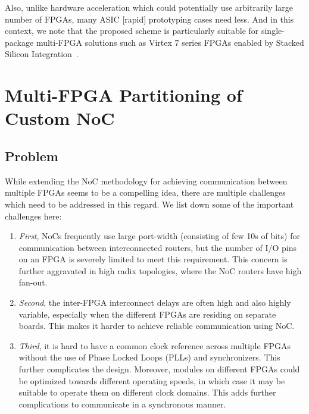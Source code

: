 \documentclass[conference, 9pt]{IEEEtran}
\begin{document}
Also, unlike hardware acceleration which could potentially use arbitrarily large number of FPGAs, many ASIC [rapid] prototyping cases need less. And in this context,
 we note that the proposed scheme is particularly suitable for single-package multi-FPGA solutions such as Virtex 7 series FPGAs enabled by Stacked Silicon Integration~\cite{xilwp380}.

\section{Multi-FPGA Partitioning of Custom NoC}
\label{sec:mfpga_part}
\subsection{Problem}

While extending the NoC methodology for achieving communication between multiple FPGAs seems to be a compelling idea, there are multiple challenges which need to be addressed in this regard. We list down some of the important challenges here:
\begin{enumerate}
	\item \emph{First}, NoCs frequently use large port-width (consisting of few 10s of bits) for communication between interconnected routers, but the number of I/O pins on an FPGA is severely limited to meet this requirement. This concern is further aggravated in high radix topologies, where the NoC routers have high fan-out.
	\item \emph{Second}, the inter-FPGA interconnect delays are often high and also highly variable, especially when the different FPGAs are residing on separate boards. This makes it harder to achieve reliable communication using NoC.
	\item \emph{Third}, it is hard to have a common clock reference across multiple FPGAs without the use of Phase Locked Loops (PLLs) and synchronizers. This further complicates the design. Moreover, modules on different FPGAs could be optimized towards different operating speeds, in which case it may be suitable to operate them on different clock domains. This adds further complications to communicate in a synchronous manner.
\end{enumerate}
\end{document}
